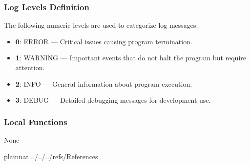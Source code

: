 \documentclass[12pt, titlepage]{article}
\begin{document}
\subsubsection{Log Levels Definition}

The following numeric levels are used to categorize log messages:

\begin{itemize}
\item \textbf{0}: ERROR — Critical issues causing program termination.
\item \textbf{1}: WARNING — Important events that do not halt the program but
require attention.
\item \textbf{2}: INFO — General information about program execution.
\item \textbf{3}: DEBUG — Detailed debugging messages for development use.
\end{itemize}

\subsubsection{Local Functions}

None

\newpage

 {plainnat}
 {../../../refs/References}



\end{document}

